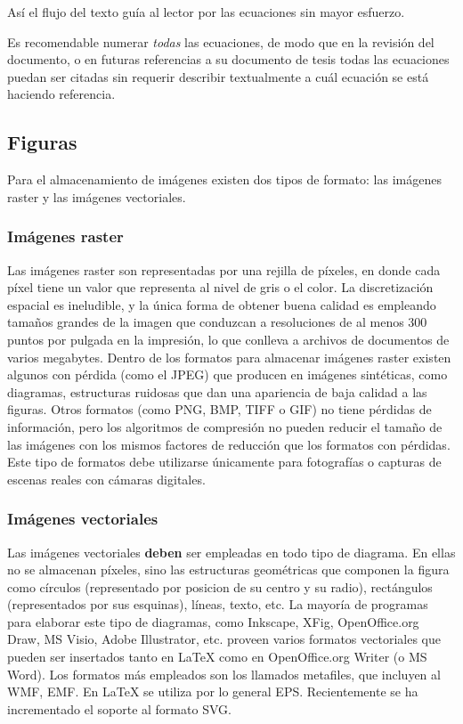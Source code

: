 Así el flujo del texto guía al lector por las ecuaciones sin mayor esfuerzo.

Es recomendable numerar \emph{todas} las ecuaciones, de modo que en la revisión
del documento, o en futuras referencias a su documento de tesis todas las
ecuaciones puedan ser citadas sin requerir describir textualmente a cuál
ecuación se está haciendo referencia.

\subsection{Figuras}

Para el almacenamiento de imágenes existen dos tipos de formato: las imágenes
raster y las imágenes vectoriales.

\subsubsection{Imágenes raster}

Las imágenes raster son representadas por una rejilla de píxeles, en donde cada
píxel tiene un valor que representa al nivel de gris o el color. La
discretización espacial es ineludible, y la única forma de obtener buena
calidad es empleando tamaños grandes de la imagen que conduzcan a resoluciones
de al menos 300 puntos por pulgada en la impresión, lo que conlleva a archivos
de documentos de varios megabytes. Dentro de los formatos para almacenar
imágenes raster existen algunos con pérdida (como el JPEG) que producen en
imágenes sintéticas, como diagramas, estructuras ruidosas que dan una
apariencia de baja calidad a las figuras. Otros formatos (como PNG, BMP, TIFF o
GIF) no tiene pérdidas de información, pero los algoritmos de compresión no
pueden reducir el tamaño de las imágenes con los mismos factores de reducción
que los formatos con pérdidas. Este tipo de formatos debe utilizarse únicamente
para fotografías o capturas de escenas reales con cámaras digitales.

\subsubsection{Imágenes vectoriales}

Las imágenes vectoriales \textbf{deben} ser empleadas en todo tipo de
diagrama. En ellas no se almacenan píxeles, sino las estructuras geométricas
que componen la figura como círculos (representado por posicion de su centro y
su radio), rectángulos (representados por sus esquinas), líneas, texto, etc. La
mayoría de programas para elaborar este tipo de diagramas, como Inkscape, XFig,
OpenOffice.org Draw, MS Visio, Adobe Illustrator, etc. proveen varios formatos
vectoriales que pueden ser insertados tanto en LaTeX como en OpenOffice.org
Writer (o MS Word). Los formatos más empleados son los llamados metafiles, que
incluyen al WMF, EMF. En LaTeX se utiliza por lo general EPS. Recientemente se
ha incrementado el soporte al formato SVG.

